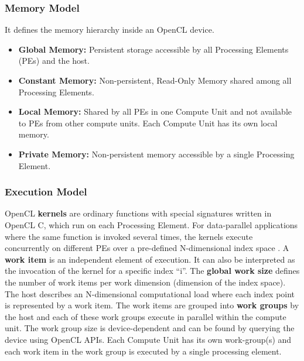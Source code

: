 \subsubsection{Memory Model}
\label{2_3_1_2}
It defines the memory hierarchy inside an OpenCL device. 
\begin{itemize}
\item \textbf{Global Memory:} Persistent storage accessible by all Processing Elements (PEs) and the host.
\item \textbf{Constant Memory:} Non-persistent, Read-Only Memory shared among all Processing Elements.
\item \textbf{Local Memory:} Shared by all PEs in one Compute Unit and not available to PEs from other compute units. Each Compute Unit has its own local memory.
\item \textbf{Private Memory:} Non-persistent memory accessible by a single Processing Element.
\end{itemize}
\subsubsection{Execution Model}
\label{2_3_1_3}
OpenCL \textbf{kernels} are ordinary functions with special signatures written in OpenCL C, which run on each Processing Element. For data-parallel applications where the same function is invoked several times, the kernels execute concurrently on different PEs over a pre-defined N-dimensional index space \cite{tompson2012introduction}. \newline \newline
A \textbf{work item} is an independent element of execution. It can also be interpreted as the invocation of the kernel for a specific index “i”. The \textbf{global work size} defines the number of work items per work dimension (dimension of the index space).\newline \newline
The host describes an N-dimensional computational load where each index point is represented by a work item. The work items are grouped into \textbf{work groups} by the host and each of these work groups execute in parallel within the compute unit. The work group size is device-dependent and can be found by querying the device using OpenCL APIs. 
Each Compute Unit has its own work-group(s) and each work item in the work group is executed by a single processing element.

